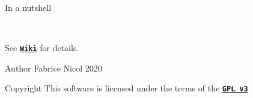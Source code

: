 In a nutshell ~\newline

\begin{DoxyCode}{0}
\end{DoxyCode}
 ~\newline


See \href{https://github.com/fabnicol/gentoo-creator/wiki}{\texttt{ {\bfseries{Wiki}}}} for details. ~\newline
\begin{DoxyAuthor}{Author}
Fabrice Nicol 2020 
\end{DoxyAuthor}
\begin{DoxyCopyright}{Copyright}
This software is licensed under the terms of the \href{https://www.gnu.org/licenses/gpl-3.0.en.html}{\texttt{ {\bfseries{G\+PL v3}}}} 
\end{DoxyCopyright}
